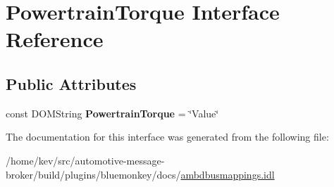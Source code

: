 \hypertarget{interfacePowertrainTorque}{\section{Powertrain\+Torque Interface Reference}
\label{interfacePowertrainTorque}
}
\subsection*{Public Attributes}
\begin{DoxyCompactItemize}
\item 
\hypertarget{interfacePowertrainTorque_a05387795ceada91bcdd252b0f48e2232}{const D\+O\+M\+String {\bfseries Powertrain\+Torque} = \char`\"{}Value\char`\"{}}\label{interfacePowertrainTorque_a05387795ceada91bcdd252b0f48e2232}

\end{DoxyCompactItemize}


The documentation for this interface was generated from the following file\+:\begin{DoxyCompactItemize}
\item 
/home/kev/src/automotive-\/message-\/broker/build/plugins/bluemonkey/docs/\hyperlink{ambdbusmappings_8idl}{ambdbusmappings.\+idl}\end{DoxyCompactItemize}
